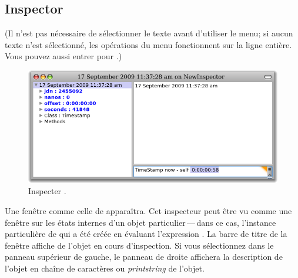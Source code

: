 \documentclass[a4paper,10pt,twoside]{book}
\begin{document}
\subsection{Inspector}

(Il n'est pas nécessaire de sélectionner le texte avant d'utiliser le menu;
si aucun texte n'est sélectionné, les opérations du menu fonctionnent
sur la ligne entière.
Vous pouvez aussi entrer  pour .)

\begin{figure}[btp]
	\begin{center}
		\includegraphics[width=\textwidth]{inspectTimeNow1}
	\end{center}
	\caption{Inspecter .}
\end{figure}

Une fenêtre comme celle de  apparaîtra.
Cet inspecteur peut être vu comme une fenêtre sur les états internes
d'un objet particulier\,---\,dans ce cas, l'instance particulière
de
 \mbox{} 
qui a été créée en évaluant l'expression 
.
La barre de titre de la fenêtre affiche   de l'objet
en cours d'inspection.
Si vous sélectionnez  dans le panneau supérieur de gauche,
le panneau de droite affichera la description de l'objet en chaîne de caractères ou \emph{printstring} de l'objet.
\end{document}
